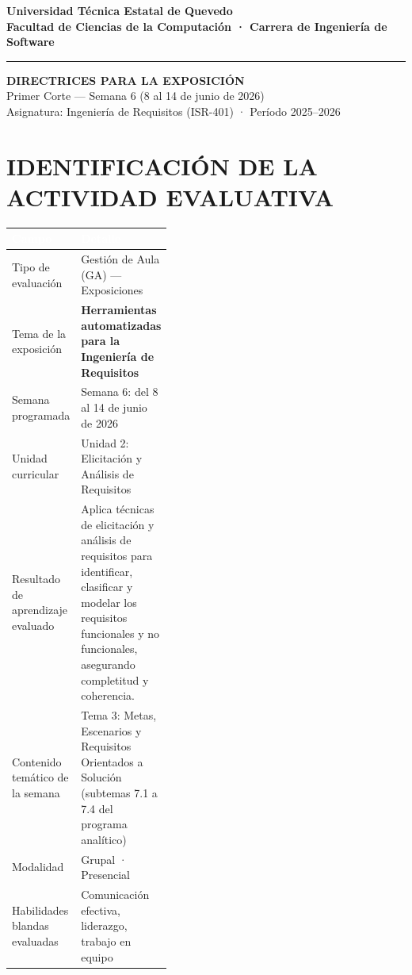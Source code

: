 \documentclass[11pt,a4paper]{article}
\newcommand{\goldrule}{\noindent\textcolor{gold}{\rule{\linewidth}{2pt}}}
\newcommand{\hdark}[1]{\cellcolor{darkblue}\textbf{\textcolor{white}{\small #1}}}
\begin{document}
	
	\begin{center}
		{\large\bfseries\color{darkblue}Universidad Técnica Estatal de Quevedo}\\[2pt]
		{\normalsize\bfseries\color{midblue}Facultad de Ciencias de la Computación · Carrera de Ingeniería de Software}\\[5pt]
	\end{center}
	\goldrule
	\vspace{4pt}
	\begin{center}
		{\LARGE\bfseries\color{darkblue}DIRECTRICES PARA LA EXPOSICIÓN}\\[4pt]
		{\large\color{midblue}Primer Corte — Semana 6 (8 al 14 de junio de 2026)}\\[2pt]
		{\normalsize\color{darkblue}Asignatura: Ingeniería de Requisitos (ISR-401) · Período 2025--2026}
	\end{center}
	\vspace{6pt}
	
	\section{IDENTIFICACIÓN DE LA ACTIVIDAD EVALUATIVA}
	
	\noindent\begin{tabularx}{\linewidth}{|L{0.40\linewidth}|X|}
		\hline
		\hdark{Campo} & \hdark{Detalle}\\
		\hline
		\small Tipo de evaluación & \small Gestión de Aula (GA) — Exposiciones\\
		\hline
		\small Tema de la exposición & \small \textbf{Herramientas automatizadas para la Ingeniería de Requisitos}\\
		\hline
		\small Semana programada & \small Semana 6: del 8 al 14 de junio de 2026\\
		\hline
		\small Unidad curricular & \small Unidad 2: Elicitación y Análisis de Requisitos\\
		\hline
		\small Resultado de aprendizaje evaluado & \small Aplica técnicas de elicitación y análisis de requisitos para identificar, clasificar y modelar los requisitos funcionales y no funcionales, asegurando completitud y coherencia.\\
		\hline
		\small Contenido temático de la semana & \small Tema 3: Metas, Escenarios y Requisitos Orientados a Solución (subtemas 7.1 a 7.4 del programa analítico)\\
		\hline
		\small Modalidad & \small Grupal · Presencial\\
		\hline
		\small Habilidades blandas evaluadas & \small Comunicación efectiva, liderazgo, trabajo en equipo\\
		\hline
	\end{tabularx}
	
\end{document}

